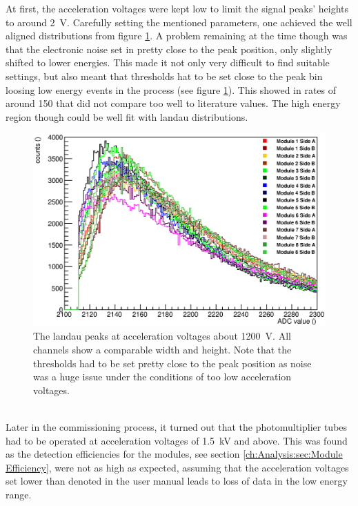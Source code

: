 	At first, the acceleration voltages were kept low to limit the signal peaks' heights to around \SI{2}{\volt}. Carefully setting the mentioned parameters, one achieved the well aligned distributions from figure \ref{fig:allPeaksBefore}. A problem remaining at the time though was that the electronic noise set in pretty close to the peak position, only slightly shifted to lower energies. This made it not only very difficult to find suitable settings, but also meant that thresholds hat to be set close to the peak bin loosing low energy events in the process (see figure \ref{fig:allPeaksBefore}). This showed in rates of around \SI{150}{\cps} that did not compare too well to literature values. The high energy region though could be well fit with landau distributions.\\
	\begin{figure}
		\centering
		\includegraphics[width = 0.9 \textwidth]{graphics/setup/LandauPeaksRun660_old.eps}
		\caption[Landau peak \SI{1200}{\volt} acceleration voltage]{The landau peaks at acceleration voltages about \SI{1200}{\volt}. All channels show a comparable width and height. Note that the thresholds had to be set pretty close to the peak position as noise was a huge issue under the conditions of too low acceleration voltages.}
		\label{fig:allPeaksBefore}
	\end{figure}\\
	Later in the commissioning process, it turned out that the photomultiplier tubes had to be operated at acceleration voltages of \SI{1.5}{\kilo\volt} and above. 
	This was found as the detection efficiencies for the modules, see section \ref{ch:Analysis:sec:Module Efficiency}, were not as high as expected, assuming that the acceleration voltages set lower than denoted in the user manual leads to loss of data in the low energy range.
